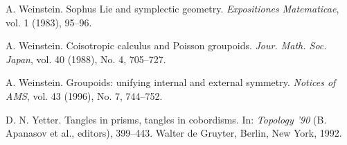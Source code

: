 \begin{description}[leftmargin=3.2em,itemsep=2pt]
\item[{[We83]}] A. Weinstein. Sophus Lie and symplectic geometry. \emph{Expositiones Matematicae}, vol. 1 (1983), 95--96.
\item[{[We88]}] A. Weinstein. Coisotropic calculus and Poisson groupoids. \emph{Jour. Math. Soc. Japan}, vol. 40 (1988), No. 4, 705--727.
\item[{[We]}] A. Weinstein. Groupoids: unifying internal and external symmetry. \emph{Notices of AMS}, vol. 43 (1996), No. 7, 744--752.
\item[{[Yet]}] D. N. Yetter. Tangles in prisms, tangles in cobordisms. In: \emph{Topology '90} (B. Apanasov et al., editors), 399--443. Walter de Gruyter, Berlin, New York, 1992.
\end{description}
\nonfrenchspacing
